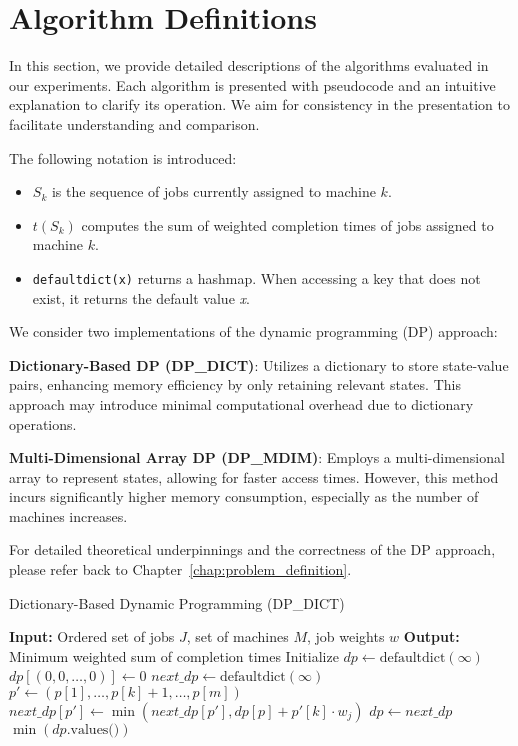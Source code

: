 \section{Algorithm Definitions} \label{sec:algorithm_definitions}

In this section, we provide detailed descriptions of the algorithms evaluated in our experiments. Each algorithm is presented with pseudocode and an intuitive explanation to clarify its operation. We aim for consistency in the presentation to facilitate understanding and comparison.

The following notation is introduced:
\begin{itemize}
    \item $S_k$ is the sequence of jobs currently assigned to machine $k$.
    \item $t(S_k)$ computes the sum of weighted completion times of jobs assigned to machine $k$.
    \item \texttt{defaultdict(x)} returns a hashmap. When accessing a key that does not exist, it returns the default value \textit{x}.
\end{itemize}

We consider two implementations of the dynamic programming (DP) approach:

\textbf{Dictionary-Based DP (DP\_DICT)}: Utilizes a dictionary to store state-value pairs, enhancing memory efficiency by only retaining relevant states. This approach may introduce minimal computational overhead due to dictionary operations.

\textbf{Multi-Dimensional Array DP (DP\_MDIM)}: Employs a multi-dimensional array to represent states, allowing for faster access times. However, this method incurs significantly higher memory consumption, especially as the number of machines increases.

For detailed theoretical underpinnings and the correctness of the DP approach, please refer back to Chapter~\ref{chap:problem_definition}.

\begin{algorithm}[H]
    \caption{Dictionary-Based Dynamic Programming (DP\_DICT)}\label{alg:dpdict}
    \begin{algorithmic}[1]
        \State \textbf{Input:} Ordered set of jobs $J$, set of machines $M$, job weights $w$
        \State \textbf{Output:} Minimum weighted sum of completion times
        \State Initialize $dp \gets \text{defaultdict}(\infty)$
        \State $dp[(0, 0, \dots, 0)] \gets 0$
            \State $next\_dp \gets \text{defaultdict}(\infty)$
                        \State $p' \gets (p[1], \dots, p[k]+1, \dots, p[m])$
                        \State $next\_dp[p'] \gets \min(next\_dp[p'], dp[p] + p'[k] \cdot w_j)$
                    \EndIf
                \EndFor
            \EndFor
            \State $dp \gets next\_dp$
        \EndFor
        \State \Return $\min(dp.\text{values()})$
    \end{algorithmic}
\end{algorithm}

